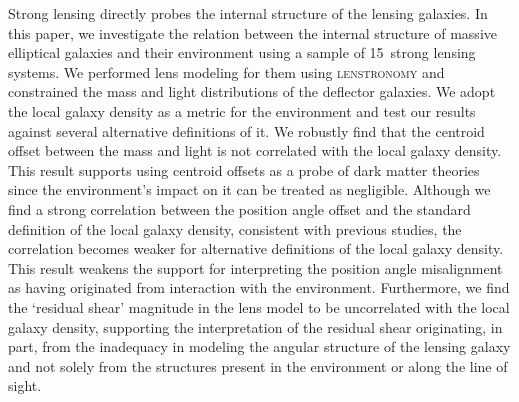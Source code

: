 \documentclass{aa}
\newcommand{\nlens}{15}
\begin{document}
  \abstract
  {Strong lensing directly probes the internal structure of the lensing galaxies. In this paper, we investigate the relation between the internal structure of massive elliptical galaxies and their environment using a sample of \nlens\ strong lensing systems. We performed lens modeling for them using \textsc{lenstronomy} and constrained the mass and light distributions of the deflector galaxies. We adopt the local galaxy density as a metric for the environment and test our results against several alternative definitions of it. We robustly find that the centroid offset between the mass and light is not correlated with the local galaxy density. This result supports using centroid offsets as a probe of dark matter theories since the environment's impact on it can be treated as negligible. Although we find a strong correlation between the position angle offset and the standard definition of the local galaxy density, consistent with previous studies, the correlation becomes weaker for alternative definitions of the local galaxy density. This result weakens the support for interpreting the position angle misalignment as having originated from interaction with the environment. Furthermore, we find the `residual shear' magnitude in the lens model to be uncorrelated with the local galaxy density, supporting the interpretation of the residual shear originating, in part, from the inadequacy in modeling the angular structure of the lensing galaxy and not solely from the structures present in the environment or along the line of sight.}
\end{document}
